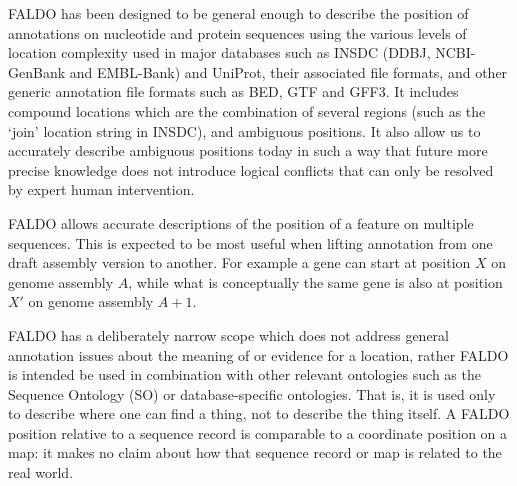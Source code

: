 FALDO has been designed to be general enough to describe the position of annotations
on nucleotide and protein sequences using the various levels of location complexity used
in major databases such as INSDC (DDBJ, NCBI-GenBank and EMBL-Bank) and UniProt, their
associated file formats, and other generic annotation file formats such as BED,
GTF and GFF3. It includes compound locations which are the combination of
several regions (such as the `join' location string in INSDC), and ambiguous
positions. It also allow us to accurately describe ambiguous positions today
in such a way that future more precise knowledge does not introduce logical conflicts 
that can only be resolved by expert human intervention.

FALDO allows accurate descriptions of the position of
a feature on multiple sequences.
This is expected to be most useful when lifting annotation from one
draft assembly version to another.
For example a gene can start at position $X$ on genome assembly $A$,
while what is conceptually the same gene is also at position $X'$ on genome assembly $A+1$.

FALDO has a deliberately narrow scope which does not address general annotation
issues about the meaning of or evidence for a location, rather FALDO is intended be
used in combination with other relevant ontologies such as the Sequence Ontology
(SO) \cite{SequenceOntology2005} or database-specific ontologies.
That is, it is used only to describe where one can find a thing, not to describe the thing itself.
A FALDO position relative to a sequence record is comparable to a
coordinate position on a map: it makes no claim about how that
sequence record or map is related to the real world.
 
